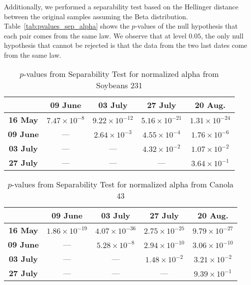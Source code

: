 \documentclass[journal]{IEEEtran}
\begin{document}
Additionally, we performed a separability test based on the Hellinger distance between the original samples assuming the Beta distribution.
Table~\ref{tab:pvalues_sep_alpha} shows the $p$-values of the null hypothesis that each pair comes from the same law.
We observe that at level $0.05$, the only null hypothesis that cannot be rejected is that the data from the two last dates come from the same law.

\begin{table}[hbt]
  \footnotesize
  \centering
  \caption{$p$-values from Separability Test for normalized alpha from Soybeans 231}
  \label{tab:pvalues_sep_alpha_sb231}
  \begin{tabular}{ccccc}
  \toprule
& \textbf{09 June} & \textbf{03 July} & \textbf{27 July} & \textbf{20 Aug.}\\ \midrule
  \textbf{16 May}  & $7.47 \times 10^{-8}$ & $9.22 \times 10^{-12}$ & $5.16 \times 10^{-21}$ & $1.31 \times 10^{-24}$ \\
  \textbf{09 June}  & --- & $2.64 \times 10^{-3}$ & $4.55 \times 10^{-4}$ & $1.76 \times 10^{-6}$ \\
  \textbf{03 July}  & --- & --- & $4.32 \times 10^{-2}$ & $1.07 \times 10^{-2}$\\
  \textbf{27 July}  & --- & --- & --- & $3.64 \times 10^{-1}$ \\
  \bottomrule
  \end{tabular}
\end{table}

\begin{table}[hbt]
  \footnotesize
  \centering
  \caption{$p$-values from Separability Test for normalized alpha from Canola 43}
  \label{tab:pvalues_sep_alpha_cn43}
  \begin{tabular}{ccccc}
  \toprule
  & \textbf{09 June} & \textbf{03 July} & \textbf{27 July} & \textbf{20 Aug.}\\ \midrule
  \textbf{16 May}  & $1.86 \times 10^{-19}$ & $4.07 \times 10^{-36}$ & $2.75 \times 10^{-25}$ & $9.79 \times 10^{-27}$ \\
  \textbf{09 June}  & --- & $5.28 \times 10^{-8}$ & $2.94 \times 10^{-10}$ & $3.06 \times 10^{-10}$ \\
  \textbf{03 July}  & --- & --- & $1.48 \times 10^{-2}$ & $3.21 \times 10^{-2}$\\
  \textbf{27 July}  & --- & --- & --- & $9.39 \times 10^{-1}$ \\
  \bottomrule
  \end{tabular}
\end{table}
\end{document}
